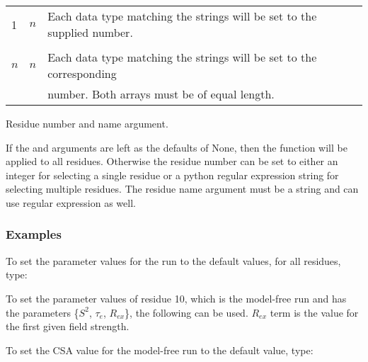 \begin{center}
\begin{tabular}{lll}
1 & $n$ & Each data type matching the strings will be set to the supplied number. \\

 &  &  \\

$n$ & $n$ & Each data type matching the strings will be set to the corresponding \\

 &  & number.  Both arrays must be of equal length. \\

\bottomrule

\end{tabular}
\end{center}


Residue number and name argument.

If the 
 and 
 arguments are left as the defaults of None, then the
function will be applied to all residues.  Otherwise the residue number can be set to either
an integer for selecting a single residue or a python  regular expression  string for
selecting multiple residues.  The residue name argument must be a string and can use regular
expression as well.


\subsubsection{Examples}

To set the parameter values for the run 
 to the default values, for all residues,
type:




To set the parameter values of residue 10, which is the model-free run 
 and has the
parameters \{$S^2$, $\tau_e$, $R_{ex}$\}, the following can be used.  $R_{ex}$ term is the value for the first
given field strength.





To set the CSA value for the model-free run 
 to the default value, type:




